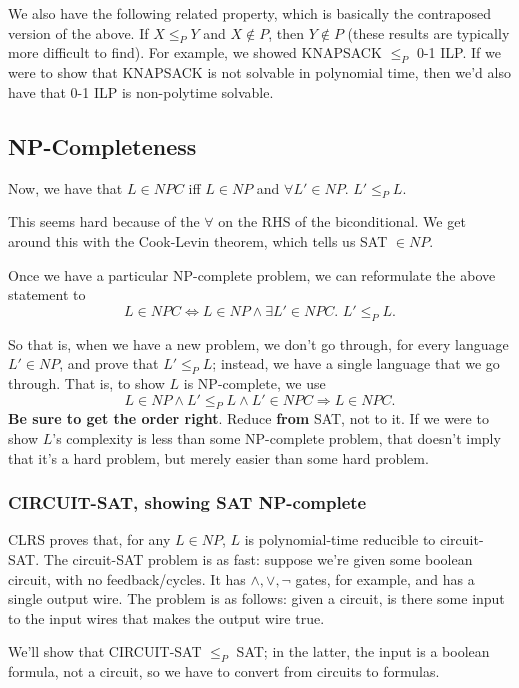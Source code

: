 \documentclass{article}
\begin{document}
We also have the following related property, which is basically the
contraposed version of the above.
If $X\leq_P Y$ and
$X\not\in P$, then $Y\not\in P$ (these results are typically more difficult
to find).
For example, we showed KNAPSACK $\leq_P$ 0-1 ILP. If we were to show that
KNAPSACK is not solvable in polynomial time, then we'd also have that 0-1 ILP
is non-polytime solvable.


\subsection{NP-Completeness}

Now, we have that $L\in NPC$ iff $L\in NP$ and 
$\forall L'\in NP.\,\,L' \leq_P L$.

This seems hard because of the $\forall$ on the RHS of the biconditional.
We get around this with the Cook-Levin theorem, which tells us SAT $\in NP$.

Once we have a particular NP-complete problem, we can reformulate the
above statement to
$$
L\in NPC \Leftrightarrow
L\in NP \wedge
\exists L'\in NPC.\,\, L' \leq_P L.
$$

So that is, when we have a new problem, we don't go through, for every language
$L'\in NP$, and prove that $L' \leq_P L$; instead, we have a single language
that we go through.
That is, to show $L$ is NP-complete, we use
$$
L\in NP \wedge L' \leq_P L \wedge L' \in NPC \Rightarrow L \in NPC.
$$
\textbf{Be sure to get the order right}.
Reduce \textbf{from} SAT, not to it.
If we were to show $L$'s complexity is less than some NP-complete problem,
that doesn't imply that it's a hard problem, but merely easier than some
hard problem.


\subsubsection{CIRCUIT-SAT, showing SAT NP-complete}

CLRS proves that, for any $L\in NP$, $L$ is polynomial-time reducible to 
circuit-SAT.
The circuit-SAT problem is as fast: suppose we're given some boolean circuit,
with no feedback/cycles. It has $\wedge,\vee,\neg$ gates, for example, and
has a single output wire.
The problem is as follows: given a circuit, is there some input to the
input wires that makes the output wire true.

We'll show that CIRCUIT-SAT $\leq_P$ SAT; in the latter, the input is a 
boolean formula, not a circuit, so we have to convert from circuits
to formulas.
\end{document}
